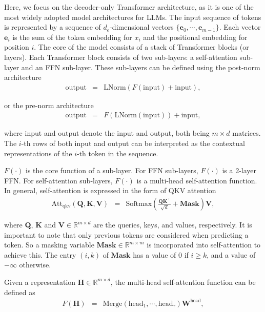 Here, we focus on the decoder-only Transformer architecture, as it is one of the most widely adopted model architectures for LLMs. The input sequence of tokens is represented by a sequence of $d_e$-dimensional vectors $\{\mathbf{e}_0,\cdots,\mathbf{e}_{m-1}\}$. Each vector $\mathbf{e}_i$ is the sum of the token embedding for $x_i$ and the positional embedding for position $i$. The core of the model consists of a stack of Transformer blocks (or layers). Each Transformer block consists of two sub-layers: a self-attention sub-layer and an FFN sub-layer. These sub-layers can be defined using the post-norm architecture
\begin{eqnarray}
\mathrm{output} & = & \mathrm{LNorm}(F(\mathrm{input}) + \mathrm{input}) \label{eq:post-norm-lm},
\end{eqnarray}

\noindent or the pre-norm architecture
\begin{eqnarray}
\mathrm{output} & = & F(\mathrm{LNorm}(\mathrm{input})) + \mathrm{input} \label{eq:pre-norm-lm},
\end{eqnarray}

\noindent where $\mathrm{input}$ and $\mathrm{output}$ denote the input and output, both being $m \times d$ matrices. The $i$-th rows of both $\mathrm{input}$ and $\mathrm{output}$ can be interpreted as the contextual representations of the $i$-th token in the sequence.

$F(\cdot)$ is the core function of a sub-layer. For FFN sub-layers, $F(\cdot)$ is a 2-layer FFN. For self-attention sub-layers, $F(\cdot)$ is a multi-head self-attention function. In general, self-attention is expressed in the form of QKV attention
\begin{eqnarray}
\mathrm{Att}_{\mathrm{qkv}}(\mathbf{Q},\mathbf{K},\mathbf{V}) & = & \mathrm{Softmax}(\frac{\mathbf{Q} \mathbf{K}^\top}{\sqrt{d}} + \mathbf{Mask}) \mathbf{V} \label{eq:qkv-attention-lm},
\end{eqnarray}

\noindent where $\mathbf{Q}$, $\mathbf{K}$ and $\mathbf{V} \in \mathbb{R}^{m \times d}$ are the queries, keys, and values, respectively. It is important to note that only previous tokens are considered when predicting a token. So a masking variable $\mathbf{Mask} \in \mathbb{R}^{m \times m}$ is incorporated into self-attention to achieve this. The entry $(i,k)$ of $\mathbf{Mask}$ has a value of 0 if $i \ge k$, and a value of $-\infty$ otherwise.

Given a representation $\mathbf{H} \in \mathbb{R}^{m \times d}$, the multi-head self-attention function can be defined as
\begin{eqnarray}
F(\mathbf{H}) & = & \mathrm{Merge}(\mathrm{head}_1,\cdots,\mathrm{head}_{\tau}) \mathbf{W}^{\mathrm{head}},
\end{eqnarray}

